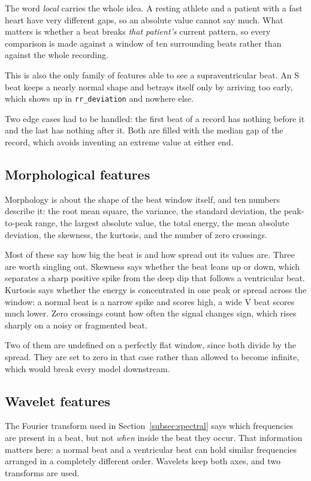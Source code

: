 \documentclass[a4paper, 12pt]{article}
\begin{document}
The word \emph{local} carries the whole idea. A resting athlete and a patient with
a fast heart have very different gaps, so an absolute value cannot say much. What
matters is whether a beat breaks \emph{that patient's} current pattern, so every
comparison is made against a window of ten surrounding beats rather than against
the whole recording.

This is also the only family of features able to see a supraventricular beat. An S
beat keeps a nearly normal shape and betrays itself only by arriving too early,
which shows up in \texttt{rr\_deviation} and nowhere else.

Two edge cases had to be handled: the first beat of a record has nothing before it
and the last has nothing after it. Both are filled with the median gap of the
record, which avoids inventing an extreme value at either end.

\subsection{Morphological features} \label{subsec:morphological}

Morphology is about the shape of the beat window itself, and ten numbers describe
it: the root mean square, the variance, the standard deviation, the peak-to-peak
range, the largest absolute value, the total energy, the mean absolute deviation,
the skewness, the kurtosis, and the number of zero crossings.

Most of these say how big the beat is and how spread out its values are. Three are
worth singling out. Skewness says whether the beat leans up or down, which
separates a sharp positive spike from the deep dip that follows a ventricular
beat. Kurtosis says whether the energy is concentrated in one peak or spread
across the window: a normal beat is a narrow spike and scores high, a wide V beat
scores much lower. Zero crossings count how often the signal changes sign, which
rises sharply on a noisy or fragmented beat.

Two of them are undefined on a perfectly flat window, since both divide by the
spread. They are set to zero in that case rather than allowed to become infinite,
which would break every model downstream.

\subsection{Wavelet features} \label{subsec:wavelets}

The Fourier transform used in Section~\ref{subsec:spectral} says which frequencies
are present in a beat, but not \emph{when} inside the beat they occur. That
information matters here: a normal beat and a ventricular beat can hold similar
frequencies arranged in a completely different order. Wavelets keep both axes, and
two transforms are used.
\end{document}
